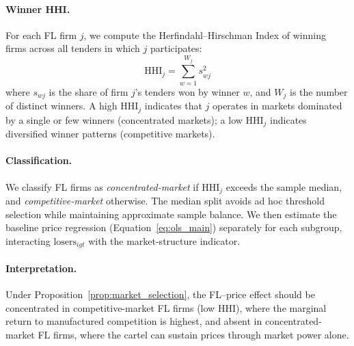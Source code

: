 \paragraph{Winner HHI.}
For each FL firm $j$, we compute the Herfindahl--Hirschman Index of
winning firms across all tenders in which $j$ participates:
\begin{equation}
  \text{HHI}_j = \sum_{w=1}^{W_j} s_{wj}^2
  \label{eq:winner_hhi}
\end{equation}
where $s_{wj}$ is the share of firm $j$'s tenders won by winner $w$,
and $W_j$ is the number of distinct winners. A high $\text{HHI}_j$
indicates that $j$ operates in markets dominated by a single or few
winners (concentrated markets); a low $\text{HHI}_j$ indicates
diversified winner patterns (competitive markets).

\paragraph{Classification.}
We classify FL firms as \emph{concentrated-market} if
$\text{HHI}_j$ exceeds the sample median, and
\emph{competitive-market} otherwise. The median split avoids ad hoc
threshold selection while maintaining approximate sample balance.
We then estimate the baseline price regression
(Equation~\ref{eq:ols_main}) separately for each subgroup,
interacting $\text{losers}_{igt}$ with the market-structure
indicator.

\paragraph{Interpretation.}
Under Proposition~\ref{prop:market_selection}, the FL--price effect
should be concentrated in competitive-market FL firms (low HHI), where
the marginal return to manufactured competition is highest, and absent
in concentrated-market FL firms, where the cartel can sustain prices
through market power alone.

